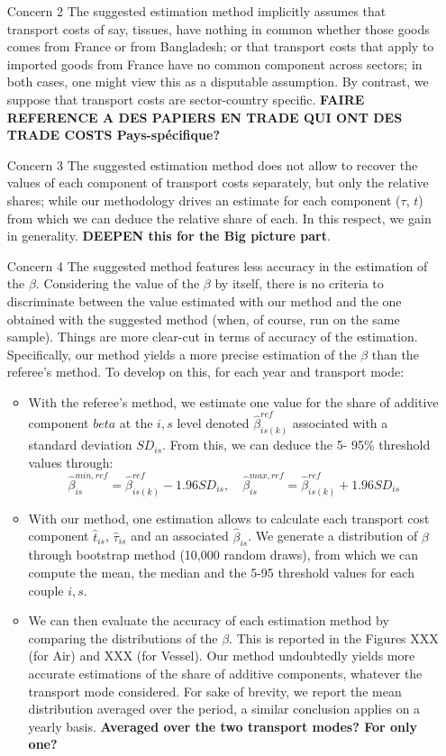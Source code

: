 \documentclass[a4paper,12pt]{article}
\begin{document}
\begin{itemize}
\begin{enumerate}
    \end{enumerate}
\item[Concern 2] The suggested estimation method implicitly assumes that transport costs of say, tissues, have nothing in common whether those goods comes from France or from Bangladesh; or that transport costs that apply to imported goods from France have no common component across sectors; in both cases, one might view this as a disputable assumption. By contrast, we suppose that transport costs are sector-country specific. \textbf{FAIRE REFERENCE A DES PAPIERS EN TRADE QUI ONT DES TRADE COSTS Pays-spécifique?}
\item[Concern 3] The suggested estimation method does not allow to recover the values of each component of transport costs separately, but only the relative shares; while our methodology drives an estimate for each component ($\tau$, $t$) from which we can deduce the relative share of each. In this respect, we gain in generality. \textbf{DEEPEN this for the Big picture part}.
\item[Concern 4] The suggested method features less accuracy in the estimation of the $\beta$. Considering the value of the $\beta$ by itself, there is no criteria to discriminate between the value estimated with our method and the one obtained with the suggested method (when, of course, run on the same sample). Things are more clear-cut in terms of accuracy of the estimation. Specifically, our method yields a more precise estimation of the $\beta$ than the referee's method. To develop on this, for each year and transport mode:
    \begin{itemize}
    \item With the referee's method, we estimate one value for the share of additive component $beta$ at the $i,s$ level denoted $\hat{\beta}^{ref}_{is(k)}$ associated with a standard deviation $SD_{is}$. From this, we can deduce the 5- 95\% threshold values through:
        $$\hat{\beta}_{is}^{min,ref} = \hat{\beta}^{ref}_{is(k)} - 1.96 SD_{is},\quad \hat{\beta}_{is}^{max,ref} = \hat{\beta}^{ref}_{is(k)} + 1.96 SD_{is}$$

    \item  With our method, one estimation allows to calculate each transport cost component $\hat{t}_{is}$, $\hat{\tau}_{is}$ and an associated $\hat{\beta}_{is}$. We generate a distribution of $\beta$ through bootstrap method (10,000 random draws), from which we can compute the mean, the median and the 5-95 threshold values for each couple $i,s$.
    \item We can then evaluate the accuracy of each estimation method by comparing the distributions of the $\beta$. This is reported in the Figures XXX (for Air) and XXX (for Vessel). Our method undoubtedly yields more accurate estimations of the share of additive components, whatever the transport mode considered. For sake of brevity, we report the mean distribution averaged over the period, a similar conclusion applies on a yearly basis. \textbf{Averaged over the two transport modes? For only one?}



\end{itemize}
\end{itemize}
\end{document}
